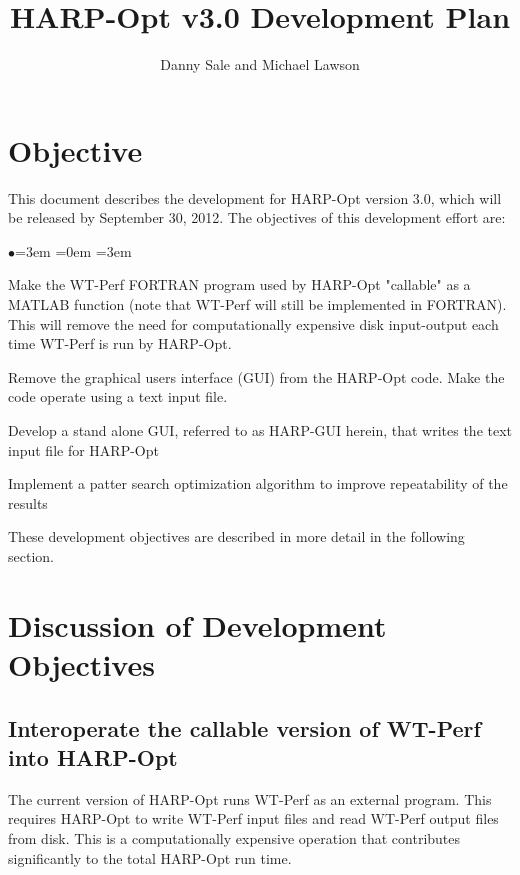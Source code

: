 \documentclass[12pt]{article}
\begin{document}
\title{HARP-Opt v3.0 Development Plan}
\author{Danny Sale and Michael Lawson}

\maketitle


\section{Objective}
This document describes the development for HARP-Opt version 3.0, which will be released by September 30, 2012. The objectives of this development effort are:
\begin{list}{$\bullet$}{\leftmargin=3em \itemindent=0em \rightmargin=3em}
	\item Make the WT-Perf FORTRAN program used by HARP-Opt "callable" as a MATLAB function (note that WT-Perf will still be implemented in FORTRAN). This will remove the need for computationally expensive disk input-output each time WT-Perf is run by HARP-Opt.
    \item Remove the graphical users interface (GUI) from the HARP-Opt code. Make the code operate using a text input file.
    \item Develop a stand alone GUI, referred to as HARP-GUI herein, that writes the text input file for HARP-Opt
    \item Implement a patter search optimization algorithm to improve repeatability of the results
\end{list}
These development objectives are described in more detail in the following section.

\section{Discussion of Development Objectives}

\subsection{Interoperate the callable version of WT-Perf into HARP-Opt}
The current version of HARP-Opt runs WT-Perf as an external program. This requires HARP-Opt to write WT-Perf input files and read WT-Perf output files from disk. This is a computationally expensive operation that contributes significantly to the total HARP-Opt run time.
 
\end{document}

